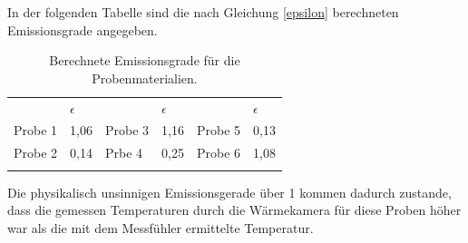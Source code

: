 In der folgenden Tabelle sind die nach Gleichung \ref{epsilon} berechneten Emissionsgrade angegeben. 

\begin{table}[H]
	\centering
	\caption{Berechnete Emissionsgrade für die Probenmaterialien.}
	\label{tab:emissionsgrade}
	\begin{tabular}{llllll}
		&    $\epsilon$  &        &  $\epsilon$    &         &  $\epsilon$    \\
		Probe 1 & 1,06 & Probe 3 & 1,16 & Probe 5 & 0,13 \\
		Probe 2 & 0,14 & Prbe 4  & 0,25 & Probe 6 & 1,08 \\
		&      &         &      &         &     
	\end{tabular}
\end{table}

Die physikalisch unsinnigen Emissionsgerade über 1 kommen dadurch zustande, dass die gemessen Temperaturen durch die Wärmekamera für diese Proben höher war als die mit dem Messfühler ermittelte Temperatur. 